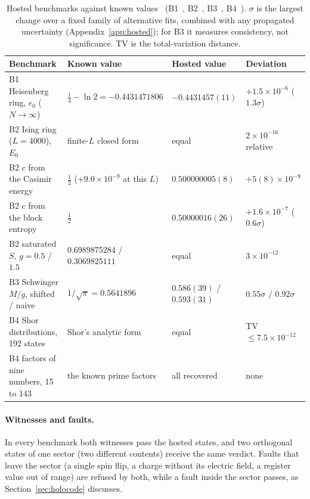 \begin{table}[htb]\centering\footnotesize\setlength{\tabcolsep}{3pt}
\caption{Hosted benchmarks against known values \tagS\ (B1~, B2~, B3~, B4~).
$\sigma$ is the largest change over a fixed family of alternative fits, combined with any propagated uncertainty
(Appendix~\ref{app:hosted}); for B3 it measures consistency, not significance. TV is the total-variation distance.}\label{tab:hosted:summary}
\begin{tabular}{@{}llll@{}}
\toprule
Benchmark & Known value & Hosted value & Deviation\\
\midrule
B1 Heisenberg ring, $e_0$ ($N\to\infty$) & $\tfrac14-\ln2=-0.4431471806$ & $-0.4431457(11)$ & $+1.5\times10^{-6}$ ($1.3\sigma$)\\
B2 Ising ring ($L=4000$), $E_0$ & finite-$L$ closed form & equal & $2\times10^{-16}$ relative\\
B2 $c$ from the Casimir energy & $\tfrac12$ ($+9.0\times10^{-9}$ at this $L$) & $0.500000005(8)$ & $+5(8)\times10^{-9}$\\
B2 $c$ from the block entropy & $\tfrac12$ & $0.50000016(26)$ & $+1.6\times10^{-7}$ ($0.6\sigma$)\\
B2 saturated $S$, $g=0.5$ / $1.5$ & $0.6989875284$ / $0.3069825111$ & equal & $3\times10^{-12}$\\
B3 Schwinger $M/g$, shifted / naive & $1/\sqrt\pi=0.5641896$ & $0.586(39)$ / $0.593(31)$ & $0.55\sigma$ / $0.92\sigma$\\
B4 Shor distributions, 192 states & Shor's analytic form & equal & TV $\le7.5\times10^{-12}$\\
B4 factors of nine numbers, 15 to 143 & the known prime factors & all recovered & none\\
\bottomrule
\end{tabular}
\end{table}

\paragraph{Witnesses and faults.} In every benchmark both witnesses pass the hosted states, and two orthogonal states of one sector (two
different contents) receive the same verdict. Faults that leave the sector (a single spin flip, a charge without its electric field, a
register value out of range) are refused by both, while a fault inside the sector passes, as Section~\ref{sec:holocode} discusses.

